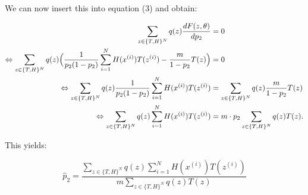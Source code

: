 \documentclass[10pt,a4paper]{article}
\begin{document}
We can now insert this into equation (3) and obtain:

\begin{align*}
\sum_{z\in \{T,H\}^N} q(z) \frac{dF(z,\theta)}{d p_2} &=0\\
\Leftrightarrow \sum_{z\in \{T,H\}^N} q(z)\Bigl ( \frac{1}{p_2(1-p_2)}\sum_{i=1}^N  H(x^{(i)})T(z^{(i)}) -  \frac{m}{1- p_2} T(z) \Bigr) &=0\\
\Leftrightarrow  \sum_{z\in \{T,H\}^N} q(z)\frac{1}{p_2(1-p_2)}\sum_{i=1}^N  H(x^{(i)})T(z^{(i)}) &=  \sum_{z\in \{T,H\}^N} q(z) \frac{m}{1- p_2} T(z)\\
\Leftrightarrow  \sum_{z\in \{T,H\}^N} q(z)\sum_{i=1}^N  H(x^{(i)})T(z^{(i)}) &=  m \cdot p_2\sum_{z\in \{T,H\}^N} q(z) T(z).
\end{align*}

This yields:

\begin{equation*}
\hat p_2 = \frac{\sum_{z\in \{T,H\}^N} q(z)\sum_{i=1}^N  H(x^{(i)})T(z^{(i)})}{m \sum_{z\in \{T,H\}^N} q(z) T(z)}
\end{equation*}

\end{document}
